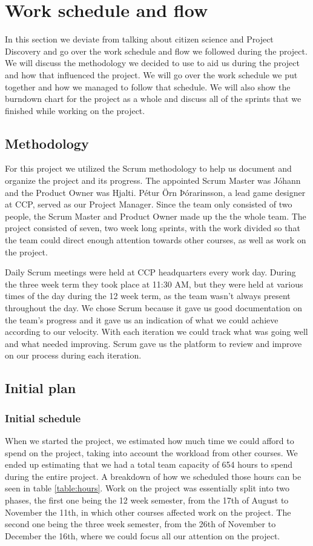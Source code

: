 \section{Work schedule and flow}\label{sec:workscheduleandflow}

In this section we deviate from talking about citizen science and Project Discovery and go over the work schedule and flow we followed during the project. We will discuss the methodology we decided to use to aid us during the project and how that influenced the project. We will go over the work schedule we put together and how we managed to follow that schedule. We will also show the burndown chart for the project as a whole and discuss all of the sprints that we finished while working on the project.

\subsection{Methodology}
	For this project we utilized the Scrum methodology to help us document and organize the project and its progress. The appointed Scrum Master was Jóhann and the Product Owner was Hjalti. Pétur Örn Þórarinsson, a lead game designer at CCP, served as our Project Manager. Since the team only consisted of two people, the Scrum Master and Product Owner made up the the whole team. The project consisted of seven, two week long sprints, with the work divided so that the team could direct enough attention towards other courses, as well as work on the project.

	Daily Scrum meetings were held at CCP headquarters every work day. During the three week term they took place at 11:30 AM, but they were held at various times of the day during the 12 week term, as the team wasn't always present throughout the day. We chose Scrum because it gave us good documentation on the team's progress and it gave us an indication of what we could achieve according to our velocity. With each iteration we could track what was going well and what needed improving. Scrum gave us the platform to review and improve on our process during each iteration.

\subsection{Initial plan}
	\subsubsection{Initial schedule}
		When we started the project, we estimated how much time we could afford to spend on the project, taking into account the workload from other courses. We ended up estimating that we had a total team capacity of 654 hours to spend during the entire project. A breakdown of how we scheduled those hours can be seen in table \ref{table:hours}. Work on the project was essentially split into two phases, the first one being the 12 week semester, from the 17th of August to November the 11th, in which other courses affected work on the project. The second one being the three week semester, from the 26th of November to December the 16th, where we could focus all our attention on the project. 
	  

